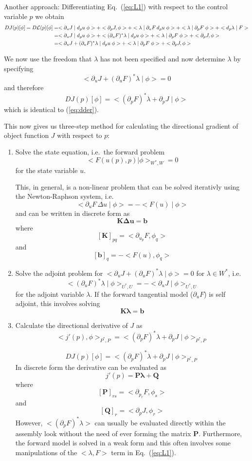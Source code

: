 \documentclass[10pt,a4paper]{book}
\newcommand{\p}{\partial}
\begin{document}
Another approach: Differentiating Eq.~(\ref{eq:L1}) with respect to the control variable $p$ we obtain
\begin{align*}
  D J(p)[\phi] = D {\cal L}(p)[\phi]  
   & = < \p_u J \mid d_p u \; \phi > + < \p_p  J, \phi >  + < \lambda  \mid \p_u F \, d_p u \; \phi > + < \lambda  \mid \p_p F \; \phi > + < d_p \lambda \mid F > \\
  & = < \p_u J \mid d_p u \; \phi >   + < (\p_u F)^\ast\lambda  \mid  d_p u \; \phi > + < \lambda  \mid \p_p F \; \phi > + < \p_p  J, \phi > \\
  & = < \p_u J +( \p_u F)^\ast\lambda \mid d_p u \; \phi >   + < \lambda  \mid \p_p F \; \phi > + < \p_p  J, \phi >
\end{align*}


We now use the freedom that $\lambda$ has not been specified and now determine $\lambda$ by specifying
\[
  < \p_u J +( \p_u F)^\ast\lambda \mid \phi >  =0
  \]
and therefore 
\begin{equation}
  D J(p)[\phi] = < (\p_p F)^\ast \lambda  + \p_p J \mid  \phi >
  \label{eq:idder}
\end{equation}
which is  identical to (\ref{eq:dder}).


This now gives us three-step method for calculating the directional
gradient of object function $J$ with respect to $p$:
\begin{enumerate}
\item Solve the state equation, i.e.\ the forward problem 
\[ 
<F(u(p),p)| \phi >_{W^\ast , W} = 0 
\]
 for the state variable $u$. 
  
This, in  general, is a non-linear problem that can be solved iterativly using the Newton-Raphson system, i.e. 
\[
 < \p_u F \, \Delta u \mid \phi > = - <F(u) \mid \phi> 
\]
and can be written in discrete form as
\[
 \bm{K} \bm{\Delta u} = \bm{b}
\]
where
\[ [\bm{K}]_{pq} = < \p_{u_p} F , \phi_q > \]
and
\[ [\bm{b}]_q= - < F(u) , \phi_q > \] 

\item Solve the adjoint problem for $< \p_u J +( \p_u F)^\ast\lambda \mid \phi >  =0$ for $\lambda \in W^\ast$, i.e.
\[
  <( \p_u F)^\ast\lambda \mid \phi >_{U^\ast , U}  = - < \p_u J \mid \phi >_{U^\ast , U} 
\]
for the adjoint variable $\lambda$. If the forward tangential model
($\p_u F$) is self adjoint, this involves solving
\[
 \bm{K} \bm{\lambda} = \bm{b}
\]

\item Calculate the directional derivative of $J$ as 
\[ 
 <j'(p),\phi>_{P^\ast,P} = < (\p_p F)^\ast \lambda  + \p_p J \mid  \phi >_{P^\ast,P} 
\]


\[ 
 D J(p)[\phi] = < (\p_p F)^\ast \lambda  + \p_p J \mid  \phi >_{P^\ast,P} 
\]
In discrete form the derivative can be evaluated as
\[
j'(p)= \bm{P} \bm{\lambda} + \bm{Q}
\]
where
\[ [\bm{P}]_{rs} = < \p_{p_r} F , \phi_s > \]
and
\[ [\bm{Q}]_r =< \p_p J , \phi_r > \] However,
$< (\p_p F)^\ast \lambda >$ can usually be evaluated directly within
the assembly look without the need of ever forming the matrix
$\bm{P}$. Furthermore, the forward model is solved in a weak form and
this often involves some manipulations of the $< \lambda , F >$ term
in Eq.~(\ref{eq:L1}).
 \end{enumerate}
\end{document}
